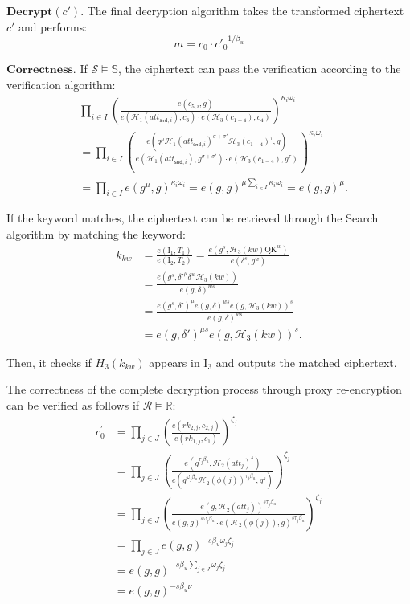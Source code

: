 \documentclass[runningheads]{llncs}
\begin{document}
$\mathbf{Decrypt}(c')$. The final decryption algorithm takes the transformed ciphertext $c'$ and performs:
$$m = c_0 \cdot {c'_0}^{1/\beta_u}$$

$\mathbf{Correctness}$.
If $ \mathcal{S} \models \mathbb{S} $, the ciphertext can pass the verification according to the verification algorithm:
$$
\begin{aligned}
&\prod_{i \in I} \left( \frac{e(c_{5,i}, g)}{e(\mathcal{H}_1(att_{\mathsf{snd},i}), c_3) \cdot e(\mathcal{H}_3(c_{1-4}), c_4)} \right)^{\kappa_i \omega_i} \\
&= \prod_{i \in I} \left( \frac{e(g^\mu \mathcal{H}_1(att_{\mathsf{snd},i})^{\sigma + \sigma'} \mathcal{H}_3(c_{1-4})^\tau, g)}{e(\mathcal{H}_1(att_{\mathsf{snd},i}), g^{\sigma + \sigma'}) \cdot e(\mathcal{H}_3(c_{1-4}), g^\tau)} \right)^{\kappa_i \omega_i} \\
&= \prod_{i \in I} e(g^\mu, g)^{\kappa_i \omega_i} = e(g, g)^{\mu \sum_{i \in I} \kappa_i \omega_i} = e(g, g)^\mu.
\end{aligned}
$$

If the keyword matches, the ciphertext can be retrieved through the Search algorithm by matching the keyword:
$$
\begin{aligned}
k_{kw} &= \frac{e(\text{I}_1, T_1)}{e(\text{I}_2, T_2)} = \frac{e(g^s, \mathcal{H}_3(kw) \text{QK}^w)}{e(\delta^s, g^w)} \\
&= \frac{e(g^s, \delta'^\mu \delta^w \mathcal{H}_3(kw))}{e(g, \delta)^{w s}} \\
&= \frac{e(g^s, \delta')^{\mu} e(g, \delta)^{w s} e(g, \mathcal{H}_3(kw))^s}{e(g, \delta)^{w s}} \\
&= e(g, \delta')^{\mu s} e(g, \mathcal{H}_3(kw))^s.
\end{aligned}
$$

Then, it checks if $H_{3}(k_{kw})$ appears in $\text{I}_3$ and outputs the matched ciphertext.

The correctness of the complete decryption process through proxy re-encryption can be verified as follows if $ \mathcal{R} \models \mathbb{R} $:
$$
\begin{aligned}
c_0^{\prime} & =\prod_{j\in J}\left(\frac{e(rk_{2,j}, c_{2,j})}{e(rk_{1,j}, c_1)}\right)^{\zeta_{j}} \\
& =\prod_{j\in J}\left(\frac{e(g^{\tau_{j}\beta_u},\mathcal{H}_2(att_{j})^{s})}{e(g^{\omega_{j}\beta_u}\mathcal{H}_2(\phi(j))^{\tau_{j}\beta_u},g^{s})}\right)^{\zeta_{j}}\\  
& =\prod_{j\in J}\left(\frac{{e(g,\mathcal{H}_2(att_{j}))^{s\tau_{j}\beta_u}}}{e(g,g)^{s\omega_{j}\beta_u}\cdot{e(\mathcal{H}_2(\phi(j)),g)^{s\tau_{j}\beta_u}}}\right)^{\zeta_{j}}\\  
& =\prod_{j\in J}e(g,g)^{-s\beta_u\omega_{j}\zeta_{j}}\\  
& =e(g,g)^{-s\beta_u\sum_{j\in J}\omega_{j}\zeta_{j}}\\  
& =e(g,g)^{-s\beta_u\nu}
\end{aligned}
$$
\end{document}
